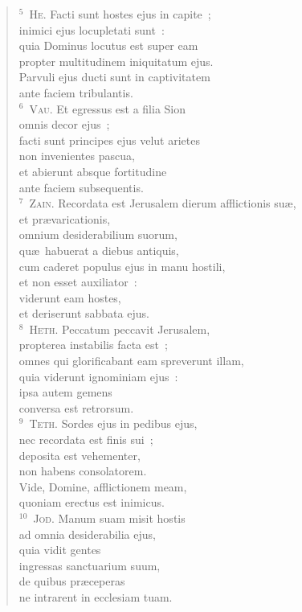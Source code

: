 \begin{flushleft}
\begin{verse}
${}^{5}$~\textsc{He.} Facti sunt hostes ejus in capite~;\\ inimici ejus locupletati sunt~:\\ quia Dominus locutus est super eam\\ propter multitudinem iniquitatum ejus.\\ Parvuli ejus ducti sunt in captivitatem\\ ante faciem tribulantis.\\
${}^{6}$~\textsc{Vau.} Et egressus est a filia Sion\\ omnis decor ejus~;\\ facti sunt principes ejus velut arietes\\ non invenientes pascua,\\ et abierunt absque fortitudine\\ ante faciem subsequentis.\\
${}^{7}$~\textsc{Zain.} Recordata est Jerusalem dierum afflictionis su\ae ,\\ et pr\ae varicationis,\\ omnium desiderabilium suorum,\\ qu\ae\ habuerat a diebus antiquis,\\ cum caderet populus ejus in manu hostili,\\ et non esset auxiliator~:\\ viderunt eam hostes,\\ et deriserunt sabbata ejus.\\
${}^{8}$~\textsc{Heth.} Peccatum peccavit Jerusalem,\\ propterea instabilis facta est~;\\ omnes qui glorificabant eam spreverunt illam,\\ quia viderunt ignominiam ejus~:\\ ipsa autem gemens\\ conversa est retrorsum.\\
${}^{9}$~\textsc{Teth.} Sordes ejus in pedibus ejus,\\ nec recordata est finis sui~;\\ deposita est vehementer,\\ non habens consolatorem.\\ Vide, Domine, afflictionem meam,\\ quoniam erectus est inimicus.\\
${}^{10}$~\textsc{Jod.} Manum suam misit hostis\\ ad omnia desiderabilia ejus,\\ quia vidit gentes\\ ingressas sanctuarium suum,\\ de quibus pr\ae ceperas\\ ne intrarent in ecclesiam tuam.\\

\end{verse}
\end{flushleft}
